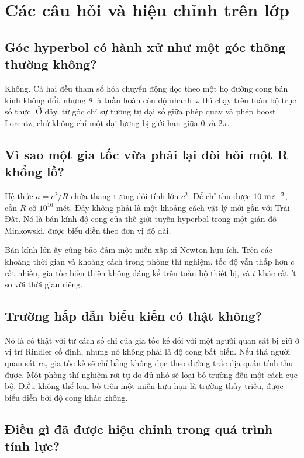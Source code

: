 \section{Các câu hỏi và hiệu chỉnh trên lớp}

\subsection{Góc hyperbol có hành xử như một góc thông thường không?}

Không. Cả hai đều tham số hóa chuyển động dọc theo một họ đường cong bán kính không đổi, nhưng \(\theta\) là tuần hoàn còn độ nhanh \(\omega\) thì chạy trên toàn bộ trục số thực. Ở đây, từ góc chỉ sự tương tự đại số giữa phép quay và phép boost Lorentz, chứ không chỉ một đại lượng bị giới hạn giữa \(0\) và \(2\pi\).

\subsection{Vì sao một gia tốc vừa phải lại đòi hỏi một R khổng lồ?}

Hệ thức \(a=c^2/R\) chứa thang tương đối tính lớn \(c^2\). Để chỉ thu được \(10\ {\rm m\,s^{-2}}\), cần \(R\) cỡ \(10^{16}\) mét. Đây không phải là một khoảng cách vật lý mới gắn với Trái Đất. Nó là bán kính độ cong của thế giới tuyến hyperbol trong một giản đồ Minkowski, được biểu diễn theo đơn vị độ dài.

Bán kính lớn ấy cũng bảo đảm một miền xấp xỉ Newton hữu ích. Trên các khoảng thời gian và khoảng cách trong phòng thí nghiệm, tốc độ vẫn thấp hơn \(c\) rất nhiều, gia tốc biến thiên không đáng kể trên toàn bộ thiết bị, và \(t\) khác rất ít so với thời gian riêng.

\subsection{Trường hấp dẫn biểu kiến có thật không?}

Nó là có thật với tư cách số chỉ của gia tốc kế đối với một người quan sát bị giữ ở vị trí Rindler cố định, nhưng nó không phải là độ cong bất biến. Nếu thả người quan sát ra, gia tốc kế sẽ chỉ bằng không dọc theo đường trắc địa quán tính thu được. Một phòng thí nghiệm rơi tự do đủ nhỏ sẽ loại bỏ trường đều một cách cục bộ. Điều không thể loại bỏ trên một miền hữu hạn là trường thủy triều, được biểu diễn bởi độ cong khác không.

\subsection{Điều gì đã được hiệu chỉnh trong quá trình tính lực?}


